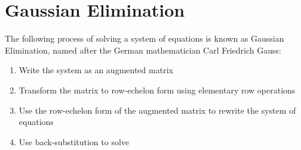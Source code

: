 \documentclass{report}
\begin{document}
\section{Gaussian Elimination}

The following process of solving a system of equations is known as Gaussian Elimination, named after the German mathematician Carl Friedrich Gauss:
\begin{enumerate}
    \item Write the system as an augmented matrix
    \item Transform the matrix to row-echelon form using elementary row operations
    \item Use the row-echelon form of the augmented matrix to rewrite the system of equations
    \item Use back-substitution to solve
\end{enumerate}
\end{document}
